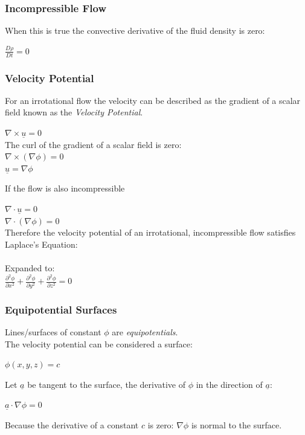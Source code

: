 \subsubsection{Incompressible Flow}
\begin{center}
\end{center}
	When this is true the convective derivative of the fluid density is zero:
	\begin{center}
		$\frac{D\rho}{Dt} = 0$
	\end{center}
\subsubsection{Velocity Potential}
For an irrotational flow the velocity can be described as the gradient of a scalar field known as the \textit{Velocity Potential}.
\begin{center}
	$\nabla \times \underline{u} = 0$
	\\
	The curl of the gradient of a scalar field is zero:
	\\
	$\nabla \times (\nabla \phi) = 0$
	\\
	$\underline{u} = \nabla\phi$
\end{center}
If the flow is also incompressible
\begin{center}
	$\nabla \cdot \underline{u} = 0$
	\\
	$\nabla \cdot (\nabla \phi) = 0$
	\\
	Therefore the velocity potential of an irrotational, incompressible flow satisfies Laplace's Equation:
	\\
	\\
	Expanded to:
	\\
	$\frac{\partial^2 \phi}{\partial x^2}+\frac{\partial^2 \phi}{\partial y^2}+\frac{\partial^2 \phi}{\partial z^2} = 0$
\end{center}
\subsubsection{Equipotential Surfaces}
Lines/surfaces of constant $\phi$ are \textit{equipotentials}.
\\
	The velocity potential can be considered a surface:
	\begin{center}
		$\phi(x,y,z)=c$
	\end{center}
	Let $\underline{a}$ be tangent to the surface, the derivative of $\phi$ in the direction of $\underline{a}$:
	\\
	\begin{center}
		$\underline{a}\cdot\nabla \phi = 0$
	\end{center}
	Because the derivative of a constant $c$ is zero: $\nabla \phi$ is normal to the surface.
	\begin{center}
	\end{center}
